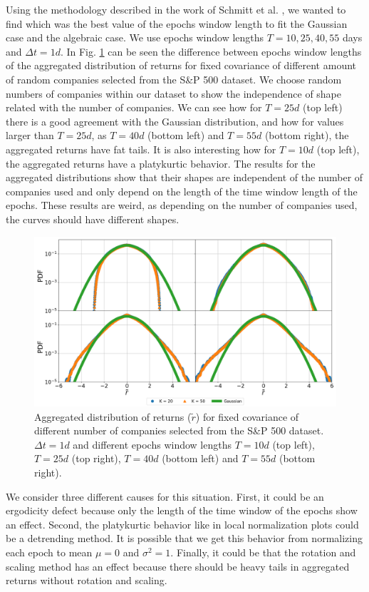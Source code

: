 Using the methodology described in the work of Schmitt et al.
\cite{non_stationarity_fin_guhr}, we wanted to find which was the best 
value of the epochs window length to fit the Gaussian case and the
algebraic case. We use epochs window lengths $T = 10, 25, 40, 55$ days and
$\Delta t = 1d$. In Fig. \ref{fig:window_comparison} can be seen the
difference between epochs window lengths of the aggregated distribution of
returns for fixed covariance of different amount of random companies
selected from the S\&P 500 dataset. We choose random numbers of companies
within our dataset to show the independence of shape related with the
number of companies. We can see how for $T=25d$ (top left) there is a good
agreement with the Gaussian distribution, and how for values larger than 
$T=25d$, as $T=40d$ (bottom left) and $T=55d$ (bottom right), the
aggregated returns have fat tails. It is also interesting how for $T=10d$
(top left), the aggregated returns have a platykurtic behavior. The results
for the aggregated distributions show that their shapes are independent of
the number of companies used and only depend on the length of the time
window length of the epochs. These results are weird, as depending on the
number of companies used, the curves should have different shapes.

\begin{figure}[htbp]
    \centering
    \includegraphics[width=0.8\columnwidth]
    {figures/05_window_comparison.png}
    \caption{Aggregated distribution of returns ($\tilde{r}$) for fixed
             covariance of different number of companies selected from the
             S\&P 500 dataset. $\Delta t = 1d$ and different epochs window
             lengths $T=10d$ (top left), $T=25d$ (top right), $T=40d$
             (bottom left) and $T=55d$ (bottom right).}
    \label{fig:window_comparison}
\end{figure}

We consider three different causes for this situation. First, it could be
an ergodicity defect because only the length of the time window of the
epochs show an effect. Second, the platykurtic behavior like in local 
normalization plots \cite{local_normalization} could be a detrending
method. It is possible that we get this behavior from normalizing each 
epoch to mean $\mu = 0$ and $\sigma^{2}=1$. Finally, it could be that the
rotation and scaling method has an effect because there should be heavy
tails in aggregated returns without rotation and scaling.

